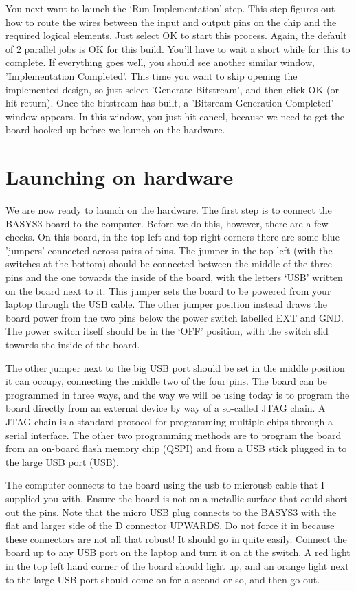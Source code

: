 \documentclass[../physical_computing.tex]{subfiles}
\begin{document}
You next want to launch the `Run Implementation' step. This step figures out how to route the wires between the input and output pins on the chip and the required logical elements. Just select OK to start this process. Again, the default of 2 parallel jobs is OK for this build. You'll have to wait a short while for this to complete. If everything goes well, you should see another similar window, 'Implementation Completed'. This time you want to skip opening the implemented design, so just select 'Generate Bitstream', and then click OK (or hit return). Once the bitstream has built, a 'Bitsream Generation Completed' window appears. In this window, you just hit cancel, because we need to get the board hooked up before we launch on the hardware.

\section{Launching on hardware}
\label{sec:launchingonhardware}

We are now ready to launch on the hardware. The first step is to connect the BASYS3 board to the computer. Before we do this, however, there are a few checks. On this board, in the top left and top right corners there are some blue 'jumpers' connected across pairs of pins. The jumper in the top left (with the switches at the bottom) should be connected between the middle of the three pins and the one towards the inside of the board, with the letters `USB' written on the board next to it. This jumper sets the board to be powered from your laptop through the USB cable. The other jumper position instead draws the board power from the two pins below the power switch labelled EXT and GND. The power switch itself should be in the `OFF' position, with the switch slid towards the inside of the board. 

The other jumper next to the big USB port should be set in the middle position it can occupy, connecting the middle two of the four pins. The board can be programmed in three ways, and the way we will be using today is to program the board directly from an external device by way of a so-called JTAG chain. A JTAG chain is a standard protocol for programming multiple chips through a serial interface. The other two programming methods are to program the board from an on-board flash memory chip (QSPI) and from a USB stick plugged in to the large USB port (USB). 

The computer connects to the board using the usb to microusb cable that I supplied you with. Ensure the board is not on a metallic surface that could short out the pins. Note that the micro USB plug connects to the BASYS3 with the flat and larger side of the D connector UPWARDS. Do not force it in because these connectors are not all that robust! It should go in quite easily. Connect the board up to any USB port on the laptop and turn it on at the switch. A red light in the top left hand corner of the board should light up, and an orange light next to the large USB port should come on for a second or so, and then go out.
\end{document}
